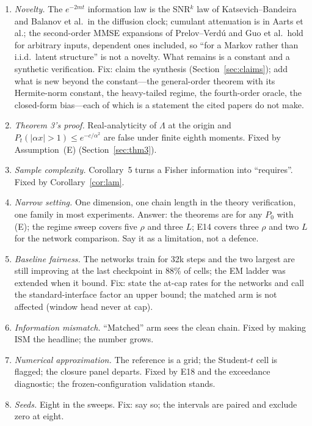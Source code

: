 \begin{enumerate}
\item \emph{Novelty.} The $e^{-2mt}$ information law is the SNR$^k$ law of Katsevich--Bandeira and Balanov et al.\ in the diffusion clock; cumulant attenuation is in Aarts et al.; the second-order MMSE expansions of Prelov--Verd\'u and Guo et al.\ hold for arbitrary inputs, dependent ones included, so ``for a Markov rather than i.i.d.\ latent structure'' is not a novelty. What remains is a constant and a synthetic verification.  Fix: claim the synthesis (Section~\ref{sec:claims}); add what is new beyond the constant---the general-order theorem with its Hermite-norm constant, the heavy-tailed regime, the fourth-order oracle, the closed-form bias---each of which is a statement the cited papers do not make.
\item \emph{Theorem 3's proof.} Real-analyticity of $\Lambda$ at the origin and $P_t(|\alpha x|>1)\le e^{-c/\alpha^2}$ are false under finite eighth moments.  Fixed by Assumption~(E) (Section~\ref{sec:thm3}).
\item \emph{Sample complexity.} Corollary~5 turns a Fisher information into ``requires''.  Fixed by Corollary~\ref{cor:lam}.
\item \emph{Narrow setting.} One dimension, one chain length in the theory verification, one family in most experiments.  Answer: the theorems are for any $P_0$ with (E); the regime sweep covers five $\rho$ and three $L$; E14 covers three $\rho$ and two $L$ for the network comparison. Say it as a limitation, not a defence.
\item \emph{Baseline fairness.} The networks train for 32k steps and the two largest are still improving at the last checkpoint in $88\%$ of cells; the EM ladder was extended when it bound.  Fix: state the at-cap rates for the networks and call the standard-interface factor an upper bound; the matched arm is not affected (window head never at cap).
\item \emph{Information mismatch.} ``Matched'' arm sees the clean chain.  Fixed by making ISM the headline; the number grows.
\item \emph{Numerical approximation.} The reference is a grid; the Student-$t$ cell is flagged; the closure panel departs.  Fixed by E18 and the exceedance diagnostic; the frozen-configuration validation stands.
\item \emph{Seeds.} Eight in the sweeps.  Fix: say so; the intervals are paired and exclude zero at eight.

\end{enumerate}

